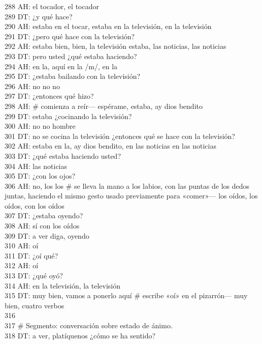 288 AH: el tocador, el tocador\\
289 DT: ¿y qué hace?\\
290 AH: estaba en el tocar, estaba en la televisión, en la televisión\\
291 DT: ¿pero qué hace con la televisión?\\
292 AH: estaba bien, bien, la televisión estaba, las noticias, las noticias\\
293 DT: pero usted ¿qué estaba haciendo?\\
294 AH: en la, aquí en la /m/, en la\\
295 DT: ¿estaba bailando con la televisión?\\
296 AH: no no no\\
297 DT: ¿entonces qué hizo?\\
298 AH: \# comienza a reír--- espérame, estaba, ay dios bendito\\
299 DT: estaba ¿cocinando la televisión?\\
300 AH: no no hombre\\
301 DT: no se cocina la televisión ¿entonces qué se hace con la televisión?\\
302 AH: estaba en la, ay dios bendito, en las noticias en las noticias\\
303 DT: ¿qué estaba haciendo usted?\\
304 AH: las noticias\\
305 DT: ¿con los ojos?\\
306 AH: no, los los \# se lleva la mano a los labios, con las puntas de los dedos juntas, haciendo el mismo gesto usado previamente para «comer»--- los oídos, los oídos, con los oídos\\
307 DT: ¿estaba oyendo?\\
308 AH: sí con los oídos\\
309 DT: a ver diga, oyendo\\
310 AH: oí\\
311 DT: ¿oí qué?\\
312 AH: oí\\
313 DT: ¿qué oyó?\\
314 AH: en la televisión, la televisión\\
315 DT: muy bien, vamos a ponerlo aquí \# escribe «oí» en el pizarrón--- muy bien, cuatro verbos\\
316 \\
317 \# Segmento: conversación sobre estado de ánimo.\\
318 DT: a ver, platíquenos ¿cómo se ha sentido?\\
